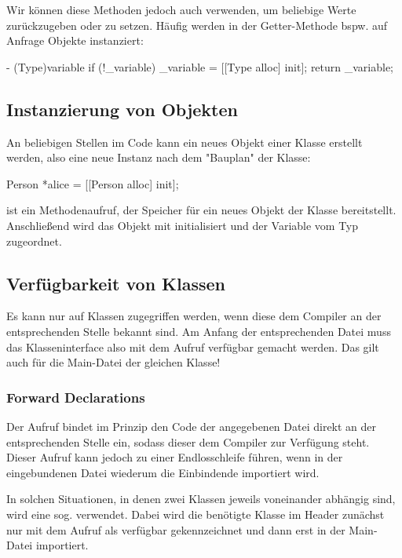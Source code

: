\documentclass[parskip=half, final]{scrreprt}
\begin{document}
Wir können diese Methoden jedoch auch verwenden, um beliebige Werte zurückzugeben oder zu setzen. Häufig werden in der Getter-Methode bspw. auf Anfrage Objekte instanziert:

\begin{objclst}
- (Type)variable {
    if (!_variable) _variable = [[Type alloc] init];
    return _variable;
}
\end{objclst}

\subsection{Instanzierung von Objekten}

An beliebigen Stellen im Code kann ein neues Objekt einer Klasse erstellt werden, also eine neue Instanz nach dem "Bauplan"{} der Klasse:
\begin{objclst}
Person *alice = [[Person alloc] init];
\end{objclst}
 ist ein Methodenaufruf, der Speicher für ein neues Objekt der Klasse  bereitstellt. Anschließend wird das Objekt mit  initialisiert und der Variable  vom Typ  zugeordnet.

\subsection{Verfügbarkeit von Klassen}
Es kann nur auf Klassen zugegriffen werden, wenn diese dem Compiler an der entsprechenden Stelle bekannt sind. Am Anfang der entsprechenden Datei muss das Klasseninterface also mit dem Aufruf  verfügbar gemacht werden. Das gilt auch für die Main-Datei der gleichen Klasse!

\subsubsection{Forward Declarations}
Der Aufruf  bindet im Prinzip den Code der angegebenen Datei direkt an der entsprechenden Stelle ein, sodass dieser dem Compiler zur Verfügung steht. Dieser Aufruf kann jedoch zu einer Endlosschleife führen, wenn in der eingebundenen Datei wiederum die Einbindende importiert wird.

In solchen Situationen, in denen zwei Klassen jeweils voneinander abhängig sind, wird eine sog.  verwendet. Dabei wird die benötigte Klasse im Header zunächst nur mit dem Aufruf  als verfügbar gekennzeichnet und dann erst in der Main-Datei importiert.
\end{document}
